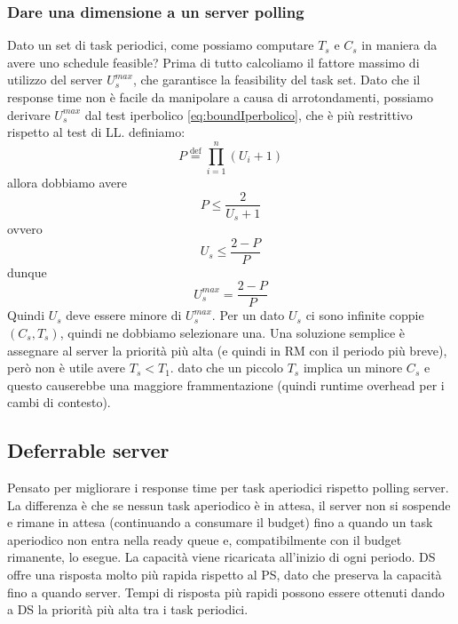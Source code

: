 \documentclass[12pt]{article}
\begin{document}
\subsubsection{Dare una dimensione a un server polling}
Dato un set di task periodici, come possiamo computare $T_s$ e $C_s$ in maniera da avere uno schedule feasible?
Prima di tutto calcoliamo il fattore massimo di utilizzo del server $U_s^{max}$, che garantisce la feasibility del task set.
Dato che il response time non è facile da manipolare a causa di arrotondamenti, possiamo derivare $U_s^{max}$ dal test iperbolico \ref{eq:boundIperbolico}, che è più restrittivo rispetto al test di LL.
definiamo:
\begin{equation}
    P \stackrel{\mathrm{def}}{=} \prod_{i=1}^{n}(U_i+1)
\end{equation}
allora dobbiamo avere 
\begin{equation}
    P \leq \frac{2}{U_s+1}
\end{equation}
ovvero
\begin{equation}
    U_s \leq \frac{2-P}{P}
\end{equation}
dunque 
\begin{equation}
    U_s^{max} = \frac{2-P}{P}
\end{equation}
Quindi $U_s$ deve essere minore di $U_s^{max}$. Per un dato $U_s$ ci sono infinite coppie $(C_s,T_s)$, quindi ne dobbiamo selezionare una.
Una soluzione semplice è assegnare al server la priorità più alta (e quindi in RM con il periodo più breve), però non è utile avere $T_s<T_1$. dato che un piccolo $T_s$ implica un minore $C_s$ e questo causerebbe una maggiore frammentazione (quindi runtime overhead per i cambi di contesto).
\subsection{Deferrable server}
\label{sec:deferrableServer}
Pensato per migliorare i response time per task aperiodici rispetto polling server.
La differenza è che se nessun task aperiodico è in attesa, il server non si sospende e rimane in attesa (continuando a consumare il budget) fino a quando un task aperiodico non entra nella ready queue e, compatibilmente con il budget rimanente, lo esegue.
La capacità viene ricaricata all'inizio di ogni periodo.
DS offre una risposta molto più rapida rispetto al PS, dato che preserva la capacità fino a quando server.
Tempi di risposta più rapidi possono essere ottenuti dando a DS la priorità più alta tra i task periodici.
\end{document}
